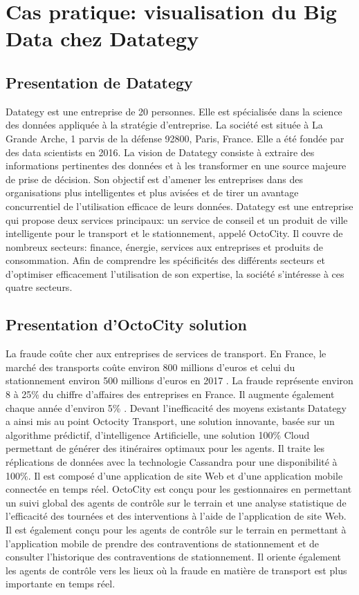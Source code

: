 \documentclass[french, a4paper, 12pt]{report}
\begin{document}

\chapter{Cas pratique: visualisation du Big Data chez Datategy}
\section{Presentation de Datategy}
Datategy est une entreprise de 20 personnes. Elle est spécialisée dans la science des données appliquée à la stratégie d'entreprise. La société est située à La Grande Arche, 1 parvis de la défense 92800, Paris, France.
Elle a été fondée par des data scientists en 2016.
La vision de Datategy consiste à extraire des informations pertinentes des données et à les transformer en une source majeure de prise de décision. Son objectif est d'amener les entreprises dans des organisations plus intelligentes et plus avisées et de tirer un avantage concurrentiel de l'utilisation efficace de leurs données.
Datategy est une entreprise qui propose deux services principaux: un service de conseil et un produit de ville intelligente pour le transport et le stationnement, appelé OctoCity.
Il couvre de nombreux secteurs: finance, énergie, services aux entreprises et produits de consommation. Afin de comprendre les spécificités des différents secteurs et d’optimiser efficacement l’utilisation de son expertise, la société s’intéresse à ces quatre secteurs.
\section{Presentation d’OctoCity solution}
La fraude coûte cher aux entreprises de services de transport. En France, le marché des transports coûte environ 800 millions d'euros et celui du stationnement environ 500 millions d'euros en 2017 \cite{16}. La fraude représente environ 8 à 25\% du chiffre d’affaires des entreprises en France. Il augmente également chaque année d'environ 5\% .
Devant l’inefficacité des moyens existants Datategy a ainsi mis au point Octocity Transport, une solution innovante, basée sur un algorithme prédictif, d’intelligence Artificielle, une solution 100\% Cloud permettant de générer des itinéraires optimaux pour les agents. Il traite les réplications de données avec la technologie Cassandra pour une disponibilité à 100\%. Il est composé d'une application de site Web et d'une application mobile connectée en temps réel.
OctoCity est conçu pour les gestionnaires en permettant un suivi global des agents de contrôle sur le terrain et une analyse statistique de l'efficacité des tournées et des interventions à l'aide de l'application de site Web. Il est également conçu pour les agents de contrôle sur le terrain en permettant à l’application mobile de prendre des contraventions de stationnement et de consulter l’historique des contraventions de stationnement. Il oriente également les agents de contrôle vers les lieux où la fraude en matière de transport est plus importante en temps réel.
\end{document}

